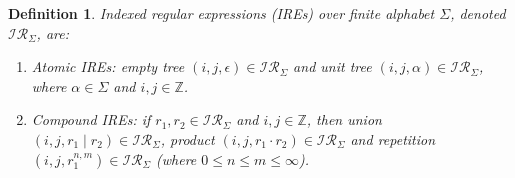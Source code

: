 \documentclass[AMA,STIX1COL]{WileyNJD-v2}
\newcommand{\XI}{\mathcal{I}}
\newcommand{\XIR}{\XI\!\XR}
\newcommand{\XR}{\mathcal{R}}
\newcommand{\YZ}{\mathbb{Z}}
\newtheorem{Xdef}{Definition}
\begin{document}
    \begin{Xdef}
    \emph{Indexed regular expressions (IREs)} over finite alphabet $\Sigma$, denoted $\XIR_\Sigma$, are:
    \begin{enumerate}
        \item Atomic IREs:
          \emph{empty tree} $(i, j, \epsilon) \in \XIR_\Sigma$ and
          \emph{unit tree} $(i, j, \alpha) \in \XIR_\Sigma$, where $\alpha \in \Sigma$ and $i, j \in \YZ$.

        \item Compound IREs: if $r_1, r_2 \in \XIR_\Sigma$ and $i, j \in \YZ$, then
          \emph{union} $(i, j, r_1 \mid r_2) \in \XIR_\Sigma$,
          \emph{product} $(i, j, r_1 \cdot r_2) \in \XIR_\Sigma$ and
          \emph{repetition} $(i, j, r_1^{n, m}) \in \XIR_\Sigma$ (where $0 \leq n \leq m \leq \infty$).
    \end{enumerate}
    \end{Xdef}
\end{document}
